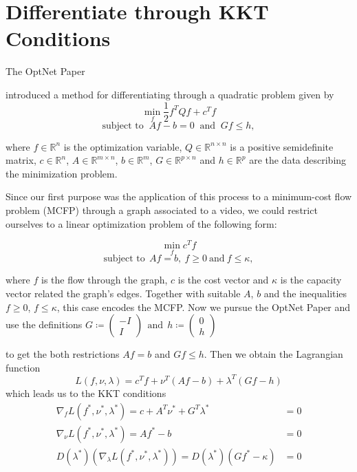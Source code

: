 \documentclass{article}
\begin{document}
\section{Differentiate through KKT Conditions}
\label{others}

The OptNet Paper {\cite{AmosK17}  introduced a method for differentiating through a quadratic problem given by
\[ \min_f \frac{1}{2} f^T Q f + c^T f \]
\[\text{subject to }~  Af-b=0 ~\text{ and }~ Gf \leq h, \]

where $f\in \mathbb{R}^n$ is the optimization variable, $Q\in \mathbb{R}^{n\times n}$ is a positive semidefinite matrix, $c\in \mathbb{R}^n$, $A\in \mathbb{R}^{m\times n}$, $b\in \mathbb{R}^m$, $G\in \mathbb{R}^{p\times n}$ and $h\in \mathbb{R}^p$ are the data describing the minimization problem. 

Since our first purpose was the application of this process to a minimum-cost flow problem (MCFP) through a graph associated to a video, we could restrict ourselves to a linear optimization problem of the following form:

\[\min_f c^T f\] 
\[ \text{subject to} ~~Af=b,~f\geq 0 ~\text{and}~ f \leq \kappa,\]

where $f$ is the flow through the graph, $c$ is the cost vector and $\kappa$ is the capacity vector related the graph's edges. Together with suitable $A$, $b$ and the inequalities $f\geq 0$, $f\leq \kappa$, this case encodes the MCFP. Now we pursue the OptNet Paper and use the definitions
$G\coloneqq \begin{pmatrix} -I \\  I \end{pmatrix} ~~\text{and} ~~ h\coloneqq \begin{pmatrix} 0 \\ h \end{pmatrix} $

to get the both restrictions $Af=b$ and $Gf\leq h$. Then we obtain the Lagrangian function
\[L(f, \nu, \lambda) = c^T f + \nu ^T (Af-b) + \lambda^T(Gf-h)\]
which leads us to the KKT conditions
\begin{align*}
\nabla_f L(f^*,\nu^*, \lambda^*) = c + A^T \nu^*  + G^T\lambda^* &= 0 \\
\nabla _\nu L(f^*, \nu^*, \lambda^*) = Af^* - b &= 0 \\
D(\lambda^*) (\nabla_\lambda L(f^*, \nu^*, \lambda^*)) = D(\lambda^*)(Gf^*-\kappa) &= 0
\end{align*}

}
\end{document}
